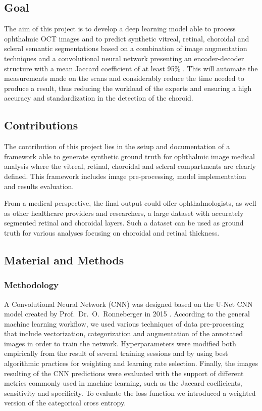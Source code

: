 \documentclass[12pt,a4paper]{scrartcl}
\begin{document}
\subsection{Goal}
The aim of this project is to develop a deep learning model able to process ophthalmic OCT images and to predict  synthetic vitreal, retinal, choroidal and scleral semantic  segmentations based on a combination of image augmentation  techniques and a convolutional neural network presenting an encoder-decoder structure with a mean Jaccard coefficient of at least 95\%   \cite{Maloca2019}. This will automate the measurements made on the scans and considerably reduce the time needed to produce a result, thus reducing the workload of the experts and ensuring a high accuracy and standardization in the detection of the choroid. 

\subsection{Contributions}

The contribution of this project lies in the setup and documentation of a framework able to generate synthetic ground truth for ophthalmic image medical analysis where the vitreal, retinal, choroidal and scleral compartments are clearly defined. This framework includes image pre-processing, model implementation and results evaluation. 

From a medical perspective, the final output could offer ophthalmologists, as well as other healthcare providers and researchers, a large dataset with accurately segmented retinal and choroidal layers. Such a dataset can be used as ground truth for various analyses focusing on choroidal and retinal thickness.

\subsection{Material and Methods}

\subsubsection{Methodology}

A Convolutional Neural Network (CNN) was designed based on the U-Net CNN model created by Prof.~Dr.~O.~Ronneberger in 2015 \cite{Ronneberger2015}. According to the general machine learning workflow, we used various techniques of data pre-processing that include vectorization, categorization and augmentation of the annotated images in order to train the network. Hyperparameters were modified both empirically from the result of several training sessions and by using best algorithmic practices for weighting and learning rate selection. Finally, the images resulting of the CNN predictions were evaluated with the support of different metrics commonly used in machine learning, such as the Jaccard coefficients, sensitivity and specificity. To evaluate the loss function we introduced a weighted version of the categorical cross entropy. 
\end{document}
